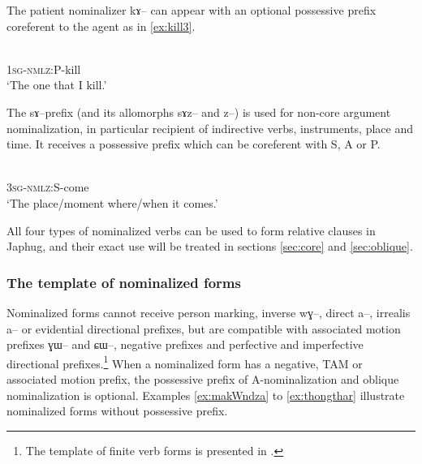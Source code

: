\documentclass[oldfontcommands,oneside,a4paper,11pt]{article}
\newcommand{\ipa}[1]{{\phon #1}} %
\begin{document}
  The patient nominalizer \ipa{kɤ--} can appear with an optional possessive prefix coreferent to the agent as in \ref{ex:kill3}.
  
  \begin{exe}
\ex \label{ex:kill3}
\gll \ipa{a-kɤ-sat}    \\
   \textsc{1sg-nmlz}:P-kill \\
 \glt  `The one that I kill.'
 \end{exe}

The \ipa{sɤ}--prefix (and its allomorphs \ipa{sɤz}-- and \ipa{z}--) is used for non-core argument nominalization, in particular   recipient of indirective verbs, instruments, place and time. It receives a possessive prefix  which can be coreferent with S, A or P.

   \begin{exe}
\ex \label{ex:come}
\gll \ipa{ɯ-sɤ-ɣi}    \\
   \textsc{3sg-nmlz}:S-come \\
 \glt  `The place/moment where/when it comes.'
 \end{exe}
 
 All four types of nominalized verbs can be used to form relative clauses in Japhug, and their exact use will be treated in sections \ref{sec:core} and \ref{sec:oblique}.
 
 \subsubsection{The template of nominalized forms}
 
Nominalized forms cannot receive person marking, inverse \ipa{wɣ}--, direct \ipa{a}--, irrealis \ipa{a}-- or evidential directional prefixes, but are compatible with associated motion prefixes \ipa{ɣɯ}-- and \ipa{ɕɯ}--, negative prefixes and perfective and imperfective directional prefixes.\footnote{The template of finite verb forms is presented in \citet{jacques13harmonization}.} When a nominalized form has a negative, TAM or associated motion prefix, the possessive prefix of A-nominalization and oblique nominalization is optional. Examples \ref{ex:makWndza} to \ref{ex:thongthar} illustrate nominalized forms without possessive prefix.
 
\end{document}
